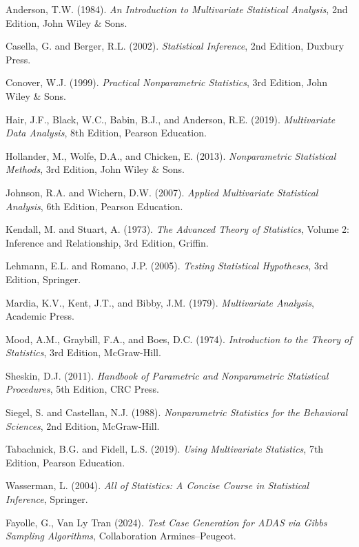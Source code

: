 \begin{thebibliography}{99}
 Anderson, T.W. (1984). \textit{An Introduction to Multivariate Statistical Analysis}, 2nd Edition, John Wiley \& Sons.

 Casella, G. and Berger, R.L. (2002). \textit{Statistical Inference}, 2nd Edition, Duxbury Press.

 Conover, W.J. (1999). \textit{Practical Nonparametric Statistics}, 3rd Edition, John Wiley \& Sons.

 Hair, J.F., Black, W.C., Babin, B.J., and Anderson, R.E. (2019). \textit{Multivariate Data Analysis}, 8th Edition, Pearson Education.

 Hollander, M., Wolfe, D.A., and Chicken, E. (2013). \textit{Nonparametric Statistical Methods}, 3rd Edition, John Wiley \& Sons.

 Johnson, R.A. and Wichern, D.W. (2007). \textit{Applied Multivariate Statistical Analysis}, 6th Edition, Pearson Education.

 Kendall, M. and Stuart, A. (1973). \textit{The Advanced Theory of Statistics}, Volume 2: Inference and Relationship, 3rd Edition, Griffin.

 Lehmann, E.L. and Romano, J.P. (2005). \textit{Testing Statistical Hypotheses}, 3rd Edition, Springer.

 Mardia, K.V., Kent, J.T., and Bibby, J.M. (1979). \textit{Multivariate Analysis}, Academic Press.

 Mood, A.M., Graybill, F.A., and Boes, D.C. (1974). \textit{Introduction to the Theory of Statistics}, 3rd Edition, McGraw-Hill.

 Sheskin, D.J. (2011). \textit{Handbook of Parametric and Nonparametric Statistical Procedures}, 5th Edition, CRC Press.

 Siegel, S. and Castellan, N.J. (1988). \textit{Nonparametric Statistics for the Behavioral Sciences}, 2nd Edition, McGraw-Hill.

 Tabachnick, B.G. and Fidell, L.S. (2019). \textit{Using Multivariate Statistics}, 7th Edition, Pearson Education.

 Wasserman, L. (2004). \textit{All of Statistics: A Concise Course in Statistical Inference}, Springer.

 Fayolle, G., Van Ly Tran (2024). \textit{Test Case Generation for ADAS via Gibbs Sampling Algorithms}, Collaboration Armines--Peugeot.

\end{thebibliography}